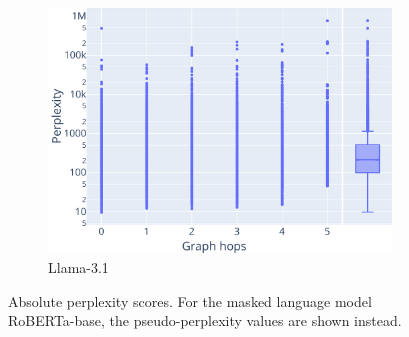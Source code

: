 \documentclass[11pt]{article}
\begin{document}
\begin{figure}
    \vspace{1em}

    \begin{subfigure}[b]{0.95\textwidth}
      \centering
      \includegraphics[width=0.95\columnwidth, height=0.3\textheight, keepaspectratio, valign=c]{../plots/meta-llama-3-1-8b_confusion_matrix_values_correlation.pdf}
      \caption{Llama-3.1}
    \end{subfigure}
  \caption{Absolute perplexity scores. For the masked language model RoBERTa-base, the pseudo-perplexity values are shown instead.}
  \label{fig:scatter}
\end{figure}
\end{document}
